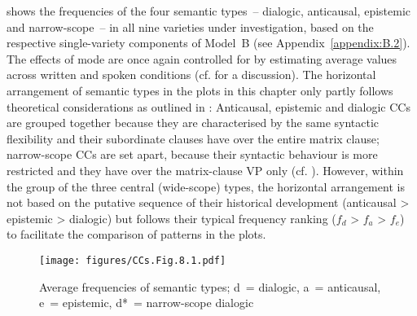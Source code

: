  shows the frequencies of the four semantic types~– dialogic, anticausal, epistemic and narrow-scope~– in all nine varieties under investigation, based on the respective single-variety components of Model~B (see Appendix~\ref{appendix:B.2}). The effects of mode are once again controlled for by estimating average values across written and spoken conditions (cf.  for a discussion). The horizontal arrangement of semantic types in the plots in this chapter only partly follows theoretical considerations as outlined in : Anticausal, epistemic and dialogic CCs are grouped together because they are characterised by the same syntactic flexibility and their subordinate clauses have  over the entire matrix clause; narrow-scope CCs are set apart, because their syntactic behaviour is more restricted and they have  over the matrix-clause VP only (cf. ). However, within the group of the three central (wide-scope) types, the horizontal arrangement is not based on the putative sequence of their historical development (anticausal > epistemic > dialogic) but follows their typical frequency ranking ($f_d$ > $f_a$ > $f_e$) to facilitate the comparison of patterns in the plots.

\begin{figure}
\texttt{[image: figures/CCs.Fig.8.1.pdf]}
\caption{\label{bkm:Ref489544014}\label{fig:8.1}Average frequencies of semantic types; d~= dialogic, a~= anticausal, e~= epistemic, d*~= narrow-scope dialogic}
\end{figure}

